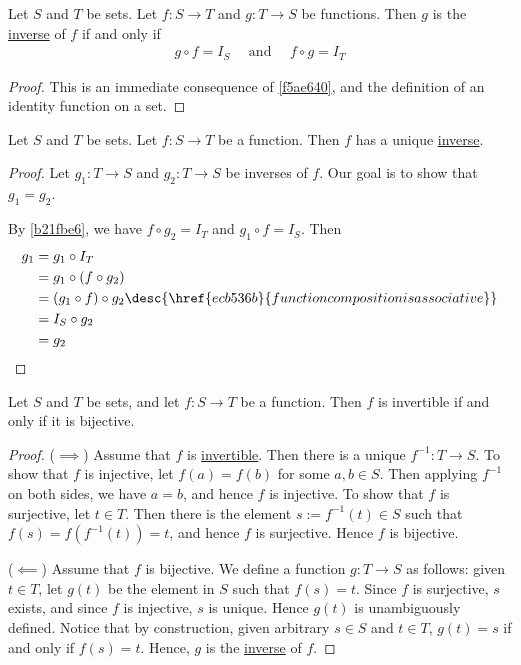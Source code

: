 \label{b21fbe6}

Let $S$ and $T$ be sets. Let $f:S\to T$ and $g:T\to S$ be functions. Then $g$
is the \href{e5e7679}{inverse} of $f$ if and only if
\begin{align*}
  g\circ f=I_S\quad\text{ and }\quad f\circ g=I_T
\end{align*}

\begin{proof}
  This is an immediate consequence of \autoref{f5ae640}, and the definition of
  an identity function on a set.
\end{proof}

\label{ed51751}

Let $S$ and $T$ be sets. Let $f:S\to T$ be a function. Then $f$ has a unique
\href{e5e7679}{inverse}.

\begin{proof}
  Let $g_1:T\to S$ and $g_2:T\to S$ be inverses of $f$. Our goal is to show
  that $g_1=g_2$.

  By \autoref{b21fbe6}, we have $f\circ g_2=I_T$ and $g_1\circ f=I_S$. Then
  \begin{align*}
    g_1 &= g_1\circ I_T                                                                    \\
        &= g_1\circ (f\circ g_2)                                                           \\
        &= (g_1\circ f)\circ g_2\desc{\href{ecb536b}{function composition is associative}} \\
        &= I_S\circ g_2                                                                    \\
        &= g_2
  \end{align*}
\end{proof}

\label{b2530a8}

Let $S$ and $T$ be sets, and let $f:S\to T$ be a function. Then $f$ is
invertible if and only if it is bijective.

\begin{proof}
  ($\implies$) Assume that $f$ is \href{e5e7679}{invertible}. Then there is a
  unique $f^{-1}:T\to S$. To show that $f$ is injective, let $f(a)=f(b)$ for
  some $a,b\in S$. Then applying $f^{-1}$ on both sides, we have $a=b$, and
  hence $f$ is injective. To show that $f$ is surjective, let $t\in T$. Then
  there is the element $s:=f^{-1}(t)\in S$ such that $f(s)=f(f^{-1}(t))=t$, and
  hence $f$ is surjective. Hence $f$ is bijective.

  ($\impliedby$) Assume that $f$ is bijective. We define a function $g:T\to S$
  as follows: given $t\in T$, let $g(t)$ be the element in $S$ such that
  $f(s)=t$. Since $f$ is surjective, $s$ exists, and since $f$ is injective, $s$
  is unique. Hence $g(t)$ is unambiguously defined. Notice that by construction,
  given arbitrary $s\in S$ and $t\in T$, $g(t)=s$ if and only if $f(s)=t$.
  Hence, $g$ is the \href{e5e7679}{inverse} of $f$.
\end{proof}

